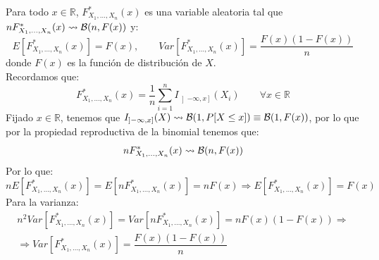 \begin{ejemplo}
    Para todo $x\in \mathbb{R}$, $F_{X_1, \ldots, X_n}^\ast(x)$ es una variable aleatoria tal que \newline $nF_{X_1, \ldots, X_n}^\ast(x) \rightsquigarrow \mathcal{B}(n,F(x))$ y:
    \begin{equation*}
        E[F_{X_1, \ldots, X_n}^\ast (x)] = F(x), \qquad Var[F_{X_1, \ldots, X_n}^\ast (x)] = \dfrac{F(x)(1-F(x))}{n}
    \end{equation*}
    donde $F(x)$ es la función de distribución de $X$.\\

    \noindent
    Recordamos que:
    \begin{equation*}
    F_{X_1, \ldots, X_n}^\ast (x) = \dfrac{1}{n}\sum\limits_{i=1}^{n}I_{\left]-\infty,x\right]}(X_i) \qquad \forall x\in \mathbb{R}
    \end{equation*}
Fijado $x\in \mathbb{R}$, tenemos que $I_{\left]-\infty,x\right]}(X)\rightsquigarrow \mathcal{B}(1,P[X\leq x]) \equiv \mathcal{B}(1,F(x))$, por lo que por la propiedad reproductiva de la binomial tenemos que:
    \begin{equation*}
        nF_{X_1, \ldots, X_n}^\ast (x) \rightsquigarrow \mathcal{B}(n,F(x))
    \end{equation*}
    Por lo que:
    \begin{equation*}
        nE[F_{X_1, \ldots, X_n}^\ast (x)] = E[nF_{X_1, \ldots, X_n}^\ast (x)] = nF(x)
        \Longrightarrow
        E[F_{X_1, \ldots, X_n}^\ast (x)] = F(x)
    \end{equation*}
    Para la varianza:
    \begin{multline*}
        n^2Var[F_{X_1, \ldots, X_n}^\ast (x)] = Var[nF_{X_1, \ldots, X_n}^\ast (x)] = nF(x)(1-F(x))
        \Longrightarrow \\ \Longrightarrow
        Var[F_{X_1, \ldots, X_n}^\ast (x)] = \dfrac{F(x)(1-F(x))}{n}
    \end{multline*}
\end{ejemplo}

